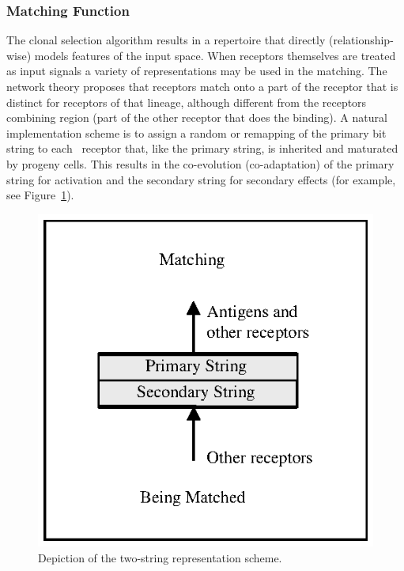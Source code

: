 %
%
\subsubsection{Matching Function}
The clonal selection algorithm results in a repertoire that directly (relationship-wise) models features of the input space. When receptors themselves are treated as input signals a variety of representations may be used in the matching. The network theory proposes that receptors match onto a part of the receptor that is distinct for receptors of that lineage, although different from the receptors combining region (part of the other receptor that does the binding). A natural implementation scheme is to assign a random or remapping of the primary bit string to each \naive\ receptor that, like the primary string, is inherited and maturated by progeny cells. This results in the co-evolution (co-adaptation) of the primary string for activation and the secondary string for secondary effects (for example, see Figure~\ref{pic:cells:network:representation}).

\begin{figure}[ht]
	\centering
	\includegraphics[scale=0.85]{Cells/network-mapping-representation}
	\caption{Depiction of the two-string representation scheme.}
	\label{pic:cells:network:representation}
\end{figure}

